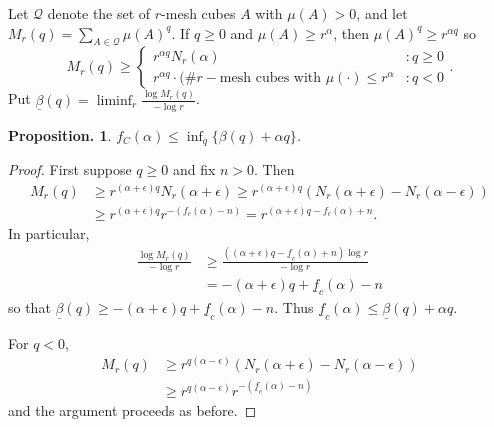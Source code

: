 \documentclass[11pt, a4paper]{memoir}
\theoremstyle{change}
\newtheorem{proposition}[theorem]{Proposition.}
\theoremstyle{plain}
\theoremstyle{nonumberplain}
\newtheorem{proof}{Proof}
\numberwithin{equation}{section}
\begin{document}
Let $\mathcal{Q}$ denote the set of $r$-mesh cubes $A$ with $\mu(A)>0$, and let $M_r(q)=\sum_{A\in\mathcal{Q}}\mu(A)^q$.
If $q\geq 0$ and $\mu(A)\geq r^\alpha$, then $\mu(A)^q\geq r^{\alpha q}$ so
\begin{equation*}
    M_r(q)\geq
    \begin{cases}
        r^{\alpha q}N_r(\alpha) &: q\geq 0\\
        r^{\alpha q}\cdot(\#r-\text{mesh cubes with }\mu(\cdot)\leq r^\alpha &: q<0
    \end{cases}.
\end{equation*}
Put $\underline{\beta}(q)=\liminf_r\frac{\log M_r(q)}{-\log r}$.
\begin{proposition}
    $f_C(\alpha)\leq\inf_q\{\beta(q)+\alpha q\}$.
\end{proposition}
\begin{proof}
    First suppose $q\geq 0$ and fix $n>0$.
    Then
    \begin{align*}
        M_r(q) &\geq r^{(\alpha+\epsilon)q}N_r(\alpha+\epsilon)\geq r^{(\alpha+\epsilon)q}(N_r(\alpha+\epsilon)-N_r(\alpha-\epsilon))\\
               &\geq r^{(\alpha+\epsilon)q}{r^{-(f_c(\alpha)-n)}}=r^{(\alpha+\epsilon)q-f_c(\alpha)+n}.
    \end{align*}
    In particular,
    \begin{align*}
        \frac{\log M_r(q)}{-\log r} &\geq\frac{\left((\alpha+\epsilon)q-\underline{f}_c(\alpha)+n\right)\log r}{-\log r}\\
                                    &= -(\alpha+\epsilon)q+\underline{f}_c(\alpha)-n
    \end{align*}
    so that $\underline{\beta}(q)\geq-(\alpha+\epsilon)q+\underline{f}_c(\alpha)-n$.
    Thus $\underline{f}_c(\alpha)\leq\underline{\beta}(q)+\alpha q$.

    For $q<0$,
    \begin{align*}
        M_r(q)&\geq r^{q(\alpha-\epsilon)}(N_r(\alpha+\epsilon)-N_r(\alpha-\epsilon))\\
              &\geq r^{q(\alpha-\epsilon)}r^{-(\underline{f}_c(\alpha)-n)}
    \end{align*}
    and the argument proceeds as before.
\end{proof}
\end{document}
